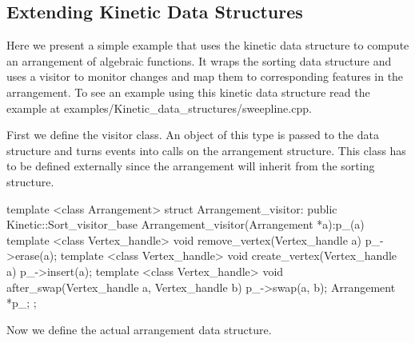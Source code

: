 

\subsection{Extending Kinetic Data Structures\label{sec:kds_sweepline_example}}


Here we present a simple example that uses the
 kinetic data structure to compute
an arrangement of algebraic functions. It wraps the sorting data
structure and uses a visitor to monitor changes and map them to
corresponding features in the arrangement. To see an example using
this kinetic data structure read the example at
examples/Kinetic\_data\_structures/sweepline.cpp.

First we define the visitor class. An object of this type is passed to
the  data structure and turns
events into calls on the arrangement structure. This class has to be
defined externally since the arrangement will inherit from the sorting
structure.

\begin{ccExampleCode}
template <class Arrangement>
struct Arrangement_visitor: public Kinetic::Sort_visitor_base
{
  Arrangement_visitor(Arrangement *a):p_(a){}
  template <class Vertex_handle>
  void remove_vertex(Vertex_handle a) {
    p_->erase(a);
  }
  template <class Vertex_handle>
  void create_vertex(Vertex_handle a) {
    p_->insert(a);
  }
  template <class Vertex_handle>
  void after_swap(Vertex_handle a, Vertex_handle b) {
    p_->swap(a, b);
  }
  Arrangement *p_;
};

\end{ccExampleCode}

Now we define the actual arrangement data structure. 

